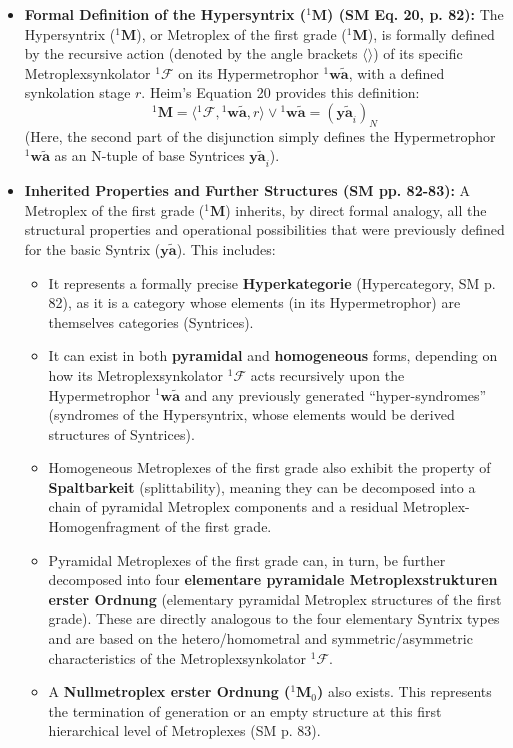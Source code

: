 \documentclass[12pt]{article}
\newcommand{\q}[1]{\enquote{#1}}
\newcommand{\syntrix}{\bm{y\widetilde{a}}}
\newcommand{\metroplex}[1]{{}^{#1}\mathbf{M}}
\newcommand{\hypersyntrix}{\metroplex{1}}
\newcommand{\hypermetrophor}[1]{{}^{#1}\mathbf{w\widetilde{a}}}
\newcommand{\metroplexsynkolator}[1]{{}^{#1}\mathcal{F}}
\newcommand{\nullmetroplex}[1]{{}^{#1}\mathbf{M}_0}
\begin{document}
\begin{itemize}
    \item \textbf{Formal Definition of the Hypersyntrix (\(\hypersyntrix\)) (SM Eq. 20, p. 82):}
    The Hypersyntrix (\(\hypersyntrix\)), or Metroplex of the first grade (\(\metroplex{1}\)), is formally defined by the recursive action (denoted by the angle brackets \( \langle \rangle \)) of its specific Metroplexsynkolator \( \metroplexsynkolator{1} \) on its Hypermetrophor \( \hypermetrophor{1} \), with a defined synkolation stage \( r \). Heim's Equation 20 provides this definition:
    \begin{equation}
    \hypersyntrix = \langle \metroplexsynkolator{1}, \hypermetrophor{1}, r \rangle \vee \hypermetrophor{1} = (\syntrix_i)_N
    \label{eq:original_metroplex_1}
    \end{equation}
    (Here, the second part of the disjunction simply defines the Hypermetrophor \( \hypermetrophor{1} \) as an N-tuple of base Syntrices \( \syntrix_i \)).

    \item \textbf{Inherited Properties and Further Structures (SM pp. 82-83):}
    A Metroplex of the first grade (\(\hypersyntrix\)) inherits, by direct formal analogy, all the structural properties and operational possibilities that were previously defined for the basic Syntrix (\(\syntrix\)). This includes:
    \begin{itemize}
        \item It represents a formally precise \textbf{Hyperkategorie} (Hypercategory, SM p. 82), as it is a category whose elements (in its Hypermetrophor) are themselves categories (Syntrices).
        \item It can exist in both \textbf{pyramidal} and \textbf{homogeneous} forms, depending on how its Metroplexsynkolator \( \metroplexsynkolator{1} \) acts recursively upon the Hypermetrophor \( \hypermetrophor{1} \) and any previously generated \q{hyper-syndromes} (syndromes of the Hypersyntrix, whose elements would be derived structures of Syntrices).
        \item Homogeneous Metroplexes of the first grade also exhibit the property of \textbf{Spaltbarkeit} (splittability), meaning they can be decomposed into a chain of pyramidal Metroplex components and a residual Metroplex-Homogenfragment of the first grade.
        \item Pyramidal Metroplexes of the first grade can, in turn, be further decomposed into four \textbf{elementare pyramidale Metroplexstrukturen erster Ordnung} (elementary pyramidal Metroplex structures of the first grade). These are directly analogous to the four elementary Syntrix types and are based on the hetero/homometral and symmetric/asymmetric characteristics of the Metroplexsynkolator \( \metroplexsynkolator{1} \).
        \item A \textbf{Nullmetroplex erster Ordnung (\( \nullmetroplex{1} \))} also exists. This represents the termination of generation or an empty structure at this first hierarchical level of Metroplexes (SM p. 83).
    \end{itemize}


\end{itemize}
\end{document}
